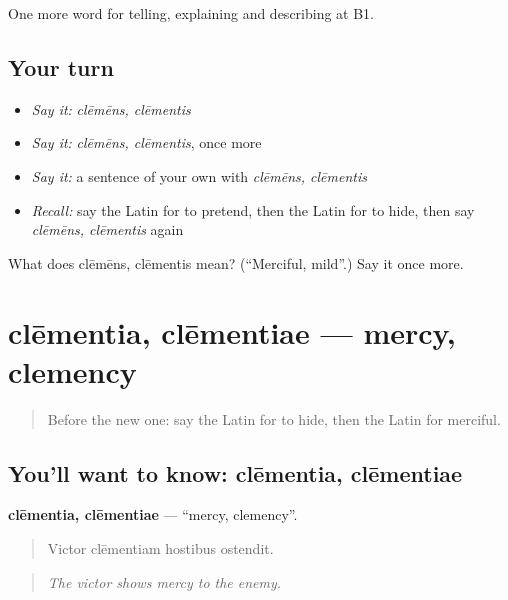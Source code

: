 \begin{grammarlens}[title={What you've built}]
One more word for telling, explaining and describing at B1.
\end{grammarlens}

\subsection*{Your turn}
\begin{itemize}
\raggedright
  \item \emph{Say it:} \emph{clēmēns, clēmentis}
  \item \emph{Say it:} \emph{clēmēns, clēmentis}, once more
  \item \emph{Say it:} a sentence of your own with \emph{clēmēns, clēmentis}
  \item \emph{Recall:} say the Latin for to pretend, then the Latin for to hide, then say \emph{clēmēns, clēmentis} again
\end{itemize}

\begin{tcolorbox}[breakable,colback=teal!4,colframe=teal!35!black,title={Before you move on}]
What does clēmēns, clēmentis mean? (\textquotedblleft{}Merciful, mild\textquotedblright{}.) Say it once more.
\end{tcolorbox}
\section[clēmentia, clēmentiae]{clēmentia, clēmentiae — mercy, clemency}

\label{lesson:LA-C505-clementia}



\begin{quote}
Before the new one: say the Latin for to hide, then the Latin for merciful.
\end{quote}

\subsection*{You'll want to know: clēmentia, clēmentiae}
\textbf{clēmentia, clēmentiae} — \textquotedblleft{}mercy, clemency\textquotedblright{}.

\begin{quote}
Victor clēmentiam hostibus ostendit.
\end{quote}

\begin{quote}
\emph{The victor shows mercy to the enemy.}
\end{quote}

